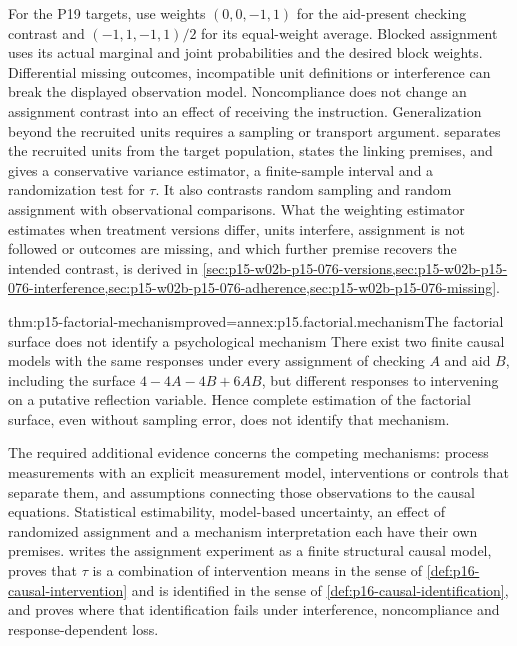 For the P19 targets, use weights \((0,0,-1,1)\) for the aid-present
checking contrast and \((-1,1,-1,1)/2\) for its equal-weight average.
Blocked assignment uses its actual marginal and joint probabilities and
the desired block weights. Differential missing outcomes, incompatible
unit definitions or interference can break the displayed observation
model. Noncompliance does not change an assignment contrast into an effect
of receiving the instruction. Generalization beyond the recruited units
requires a sampling or transport argument.
 separates the recruited units from the target
population, states the linking premises, and gives a conservative variance
estimator, a finite-sample interval and a randomization test for \(\tau\).
It also contrasts random sampling and random assignment with observational
comparisons. What the weighting estimator estimates when treatment versions
differ, units interfere, assignment is not followed or outcomes are missing,
and which further premise recovers the intended contrast, is derived in
\cref{sec:p15-w02b-p15-076-versions,sec:p15-w02b-p15-076-interference,sec:p15-w02b-p15-076-adherence,sec:p15-w02b-p15-076-missing}.

\begin{hbtheorem}{thm:p15-factorial-mechanism}{proved=annex:p15.factorial.mechanism}{The factorial surface does not identify a psychological mechanism}
There exist two finite causal models with the same responses under every
assignment of checking \(A\) and aid \(B\), including the surface
\(4-4A-4B+6AB\), but different responses to intervening on a putative
reflection variable. Hence complete estimation of the factorial surface,
even without sampling error, does not identify that mechanism.
\end{hbtheorem}

The required additional evidence concerns the competing mechanisms:
process measurements with an explicit measurement model, interventions or
controls that separate them, and assumptions connecting those observations
to the causal equations. Statistical estimability, model-based uncertainty,
an effect of randomized assignment and a mechanism interpretation each have
their own premises.  writes the
assignment experiment as a finite structural causal model, proves that
\(\tau\) is a combination of intervention means in the sense of
\cref{def:p16-causal-intervention} and is identified in the sense of
\cref{def:p16-causal-identification}, and proves where that identification
fails under interference, noncompliance and response-dependent loss.
